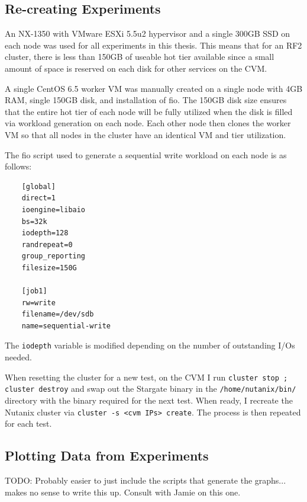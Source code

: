 \documentclass[12pt]{article}
\begin{document}
  \subsection{Re-creating Experiments}

  An NX-1350 with VMware ESXi 5.5u2 hypervisor and a single 300GB SSD on each
  node was used for all experiments in this thesis. This means that for an RF2
  cluster, there is less than 150GB of useable hot tier available since a small
  amount of space is reserved on each disk for other services on the CVM.

  A single CentOS 6.5 worker VM was manually created on a single node with 4GB
  RAM, single 150GB disk, and installation of fio. The 150GB disk size ensures
  that the entire hot tier of each node will be fully utilized when the disk is
  filled via workload generation on each node. Each other node then clones the
  worker VM so that all nodes in the cluster have an identical VM and tier
  utilization.

  The fio script used to generate a sequential write workload on each node is
  as follows:
  
  \begin{verbatim}
    [global]
    direct=1
    ioengine=libaio
    bs=32k
    iodepth=128
    randrepeat=0
    group_reporting
    filesize=150G

    [job1]
    rw=write
    filename=/dev/sdb
    name=sequential-write
  \end{verbatim}

  The \verb|iodepth| variable is modified depending on the number of
  outstanding I/Os needed.

  When resetting the cluster for a new test, on the CVM I run
  \verb|cluster stop ; cluster destroy| and swap out the Stargate binary in
  the \verb|/home/nutanix/bin/| directory with the binary required for the next
  test. When ready, I recreate the Nutanix cluster via
  \verb|cluster -s <cvm IPs> create|. The process is then repeated for each
  test.

  \subsection{Plotting Data from Experiments}

  TODO: Probably easier to just include the scripts that generate the graphs...
  makes no sense to write this up. Consult with Jamie on this one.

\end{document}
